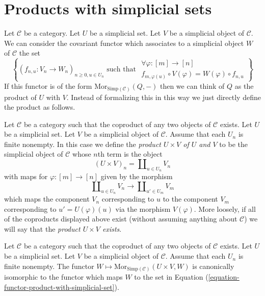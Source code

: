 \section{Products with simplicial sets}
\label{section-product-with-simplicial-sets}

\noindent
Let $\mathcal{C}$ be a category.
Let $U$ be a simplicial set.
Let $V$ be a simplicial object of $\mathcal{C}$.
We can consider the covariant functor which associates
to a simplicial object $W$ of $\mathcal{C}$
the set
\begin{equation}
\label{equation-functor-product-with-simplicial-set}
\left\{
(f_{n, u} : V_n \to W_n)_{n \geq 0, u \in U_n}
\text{ such that }
\begin{matrix}
\forall \varphi : [m] \to [n] \\
f_{m, \varphi(u)} \circ V(\varphi) = W(\varphi) \circ f_{n, u}
\end{matrix}
\right\}
\end{equation}
If this functor is of the form
$\text{Mor}_{\text{Simp}(\mathcal{C})}(Q, -)$
then we can think of $Q$ as the product of $U$ with $V$.
Instead of formalizing this in this way we just directly
define the product as follows.

\begin{definition}
\label{definition-product-with-simplicial-set}
Let $\mathcal{C}$ be a category such that the coproduct of
any two objects of $\mathcal{C}$ exists. Let
$U$ be a simplicial set. Let $V$ be a simplicial
object of $\mathcal{C}$. Assume that each $U_n$ is
finite nonempty. In this case we define
the {\it product $U \times V$ of $U$ and $V$}
to be the simplicial object of $\mathcal{C}$ whose
$n$th term is the object
$$
(U \times V)_n = \coprod\nolimits_{u\in U_n} V_n
$$
with maps for $\varphi : [m] \to [n]$ given by the
morphism
$$
\coprod\nolimits_{u\in U_n} V_n
\longrightarrow
\coprod\nolimits_{u'\in U_m} V_m
$$
which maps the component $V_n$ corresponding to $u$ to the
component $V_m$ corresponding to $u' = U(\varphi)(u)$
via the morphism $V(\varphi)$.
More loosely, if all of the coproducts displayed above
exist (without assuming anything about $\mathcal{C}$)
we will say that the {\it product $U \times V$ exists}.
\end{definition}

\begin{lemma}
\label{lemma-check-product-with-simplicial-set}
Let $\mathcal{C}$ be a category such that the coproduct of
any two objects of $\mathcal{C}$ exists. Let
$U$ be a simplicial set. Let $V$ be a simplicial
object of $\mathcal{C}$. Assume that each $U_n$ is
finite nonempty. The functor
$W \mapsto \text{Mor}_{\text{Simp}(\mathcal{C})}(U\times V, W)$
is canonically isomorphic to the functor which
maps $W$ to the set in
Equation (\ref{equation-functor-product-with-simplicial-set}).
\end{lemma}

